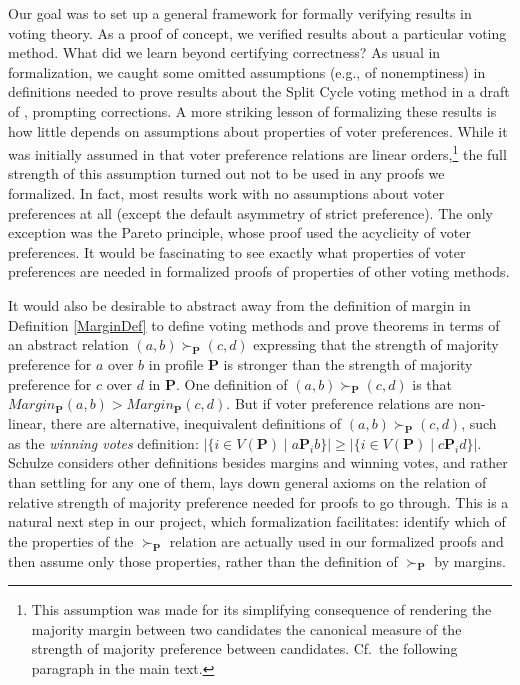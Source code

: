 \documentclass[runningheads]{llncs}
\begin{document}
Our goal was to set up a general framework for formally verifying results in voting theory. As a proof of concept, we verified results about a particular voting method. What did we learn beyond certifying correctness? As usual in formalization, we caught some omitted assumptions (e.g., of nonemptiness) in definitions needed to prove results about the Split Cycle voting method in a draft of \cite{HP2020b}, prompting corrections. A more striking lesson of formalizing these results is how little depends on assumptions about properties of voter preferences. While it was initially assumed in \cite{HP2020b} that voter preference relations are linear orders,\footnote{This assumption was made for its simplifying consequence of rendering the majority margin between two candidates the canonical measure of the strength of majority preference between candidates. Cf.~the following paragraph in the main text.} the full strength of this assumption turned out not to be used in any proofs we formalized. In fact, most results work with no assumptions about voter preferences at all (except the default asymmetry of strict preference). The only exception was the Pareto principle, whose proof used the acyclicity of voter preferences. It would be fascinating to see exactly what properties of voter preferences are needed in formalized proofs of properties of other voting methods.

It would also be desirable to abstract away from the definition of margin in Definition \ref{MarginDef} to define voting methods and prove theorems in terms of an abstract relation $(a,b)\succ_\mathbf{P} (c,d)$ expressing that the strength of majority preference for $a$ over $b$ in profile $\mathbf{P}$ is stronger than the strength of majority preference for $c$ over $d$ in $\mathbf{P}$. One definition of $(a,b)\succ_\mathbf{P} (c,d)$ is that $Margin_\mathbf{P}(a,b)>Margin_\mathbf{P}(c,d)$. But if voter preference relations are non-linear, there are alternative, inequivalent definitions of $(a,b)\succ_\mathbf{P} (c,d)$, such as the \textit{winning votes} definition: $\big|\{i\in V(\mathbf{P})\mid a\mathbf{P}_ib\}\big| \geq \big|\{i\in V(\mathbf{P})\mid c\mathbf{P}_id\}\big|$. Schulze \cite{Schulze2011} considers other definitions besides margins and winning votes, and rather than settling for any one of them, lays down general axioms on the relation of relative strength of majority preference needed for proofs to go through. This is a natural next step in our project, which formalization facilitates: identify which of the properties of the $\succ_\mathbf{P}$ relation are actually used in our formalized proofs and then assume only those properties, rather than the definition of $\succ_\mathbf{P}$ by margins.%
\end{document}
